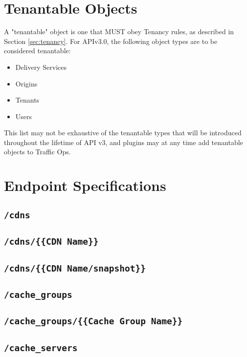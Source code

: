 \documentclass{article}
\newcommand{\code}[1]{\texttt{\color{inlinecodecolor}#1}}
\begin{document}
\section{Tenantable Objects\label{sec:tenantable}}
A "tenantable" object is one that MUST obey Tenancy rules, as described in Section \ref{sec:tenancy}. For APIv3.0, the following
object types are to be considered tenantable:

\begin{itemize}
	\item Delivery Services
	\item Origins
	\item Tenants
	\item Users
\end{itemize}

This list may not be exhaustive of the tenantable types that will be introduced throughout the lifetime of API v3, and plugins
may at any time add tenantable objects to Traffic Ops.

\section{Endpoint Specifications}

\subsection{\code{/cdns}}

\subsection{\code{/cdns/\{\{CDN Name\}\}}}

\subsection{\code{/cdns/\{\{CDN Name/snapshot\}\}}}

\subsection{\code{/cache\_groups}}

\subsection{\code{/cache\_groups/\{\{Cache Group Name\}\}}}

\subsection{\code{/cache\_servers}}
\end{document}
